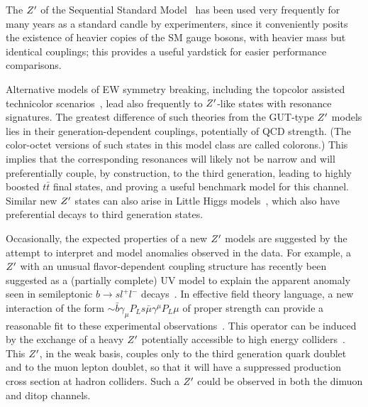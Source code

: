 The $Z^{\prime}$ of the Sequential Standard Model~\cite{Altarelli:1989ff} has been used very frequently for many years as a standard candle by experimenters, since it conveniently posits the existence of heavier copies of the SM gauge bosons,
with heavier mass but identical couplings; this provides a useful yardstick for easier performance comparisons.

Alternative models of EW symmetry breaking, including the topcolor assisted technicolor scenarios~\cite{Hill:1994hp}, lead also frequently to $Z^{\prime}$-like states
with resonance signatures. The greatest difference of such theories from the GUT-type $Z^{\prime}$ models lies in their generation-dependent couplings,
potentially of QCD strength. (The color-octet versions of such states in this model class are called colorons.) This implies that the corresponding resonances will likely not be narrow and
will preferentially couple, by construction, to the
third generation, leading to highly boosted $t\bar t$ final states, and proving a useful benchmark model for this channel. Similar new $Z^{\prime}$ states can also arise in Little Higgs
models~\cite{ArkaniHamed:2001nc}, which also have preferential decays to third generation states.

Occasionally, the expected properties of a new $Z^{\prime}$ models are suggested by the attempt to interpret and model anomalies observed in the data. For example, a $Z^{\prime}$ with an unusual flavor-dependent coupling structure has recently been suggested as
a (partially complete) UV model to explain the apparent anomaly seen in semileptonic $b\rightarrow sl^+l^-$ decays~\cite{Aaij:2014ora,Aaij:2017vbb}. In effective field theory language,
a new interaction of the form $\sim \bar b\gamma_\mu P_Ls \bar \mu \gamma^\mu P_L \mu$ of proper strength can provide a reasonable fit to these experimental observations~\cite{Bifani:2018zmi}. This operator can
be induced by the exchange of a
heavy $Z^{\prime}$ potentially accessible to high energy colliders~\cite{Allanach:2017bta}. This $Z^{\prime}$, in the weak basis, couples only to the third generation quark doublet and to the
muon lepton doublet, so that it will have a suppressed production cross section at hadron colliders. Such a $Z^{\prime}$ could be observed in both the dimuon and ditop channels.

